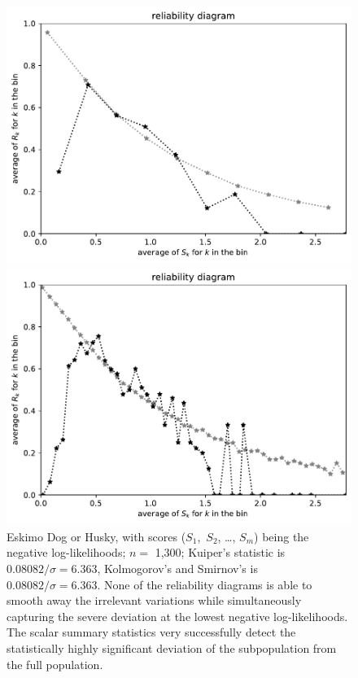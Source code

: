 \documentclass{article}
\begin{document}
\begin{figure}
\begin{centering}
\parbox{\imsize}{\includegraphics[width=\imsize]
                {./codes/unweighted/nll-1-248-Eskimo-dog-huskyequiscore10}}
\quad\quad
\parbox{\imsize}{\includegraphics[width=\imsize]
                {./codes/unweighted/nll-1-248-Eskimo-dog-huskyequiscore50}}

\end{centering}
\caption{Eskimo Dog or Husky, with scores ($S_1$,~$S_2$, \dots, $S_m$)
         being the negative log-likelihoods;
         $n =$ 1,300; Kuiper's statistic is $0.08082 / \sigma = 6.363$,
         Kolmogorov's and Smirnov's is $0.08082 / \sigma = 6.363$.
None of the reliability diagrams is able
to smooth away the irrelevant variations while simultaneously capturing
the severe deviation at the lowest negative log-likelihoods.
The scalar summary statistics very successfully
detect the statistically highly significant deviation
of the subpopulation from the full population.
}
\label{eskimo-dog-husky-nll}
\end{figure}
\end{document}
